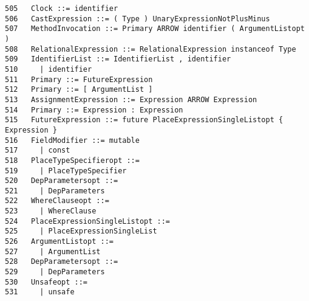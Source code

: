 \begin{verbatim}
505   Clock ::= identifier
506   CastExpression ::= ( Type ) UnaryExpressionNotPlusMinus
507   MethodInvocation ::= Primary ARROW identifier ( ArgumentListopt )
508   RelationalExpression ::= RelationalExpression instanceof Type
509   IdentifierList ::= IdentifierList , identifier
510     | identifier
511   Primary ::= FutureExpression
512   Primary ::= [ ArgumentList ]
513   AssignmentExpression ::= Expression ARROW Expression
514   Primary ::= Expression : Expression
515   FutureExpression ::= future PlaceExpressionSingleListopt { Expression }
516   FieldModifier ::= mutable
517     | const
518   PlaceTypeSpecifieropt ::=
519     | PlaceTypeSpecifier
520   DepParametersopt ::=
521     | DepParameters
522   WhereClauseopt ::=
523     | WhereClause
524   PlaceExpressionSingleListopt ::=
525     | PlaceExpressionSingleList
526   ArgumentListopt ::=
527     | ArgumentList
528   DepParametersopt ::=
529     | DepParameters
530   Unsafeopt ::=
531     | unsafe
\end{verbatim}

\twocolumn